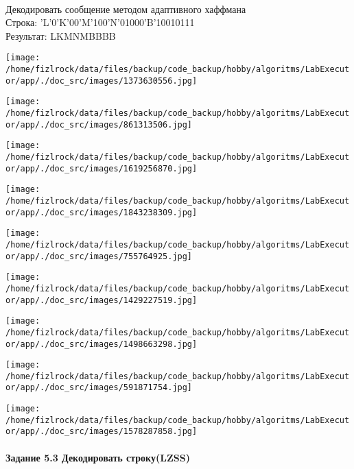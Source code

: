 \documentclass[a4paper, 12pt]{article}
\begin{document}
\\ 

Декодировать сообщение методом адаптивного хаффмана \\
Строка: 
'L'0'K'00'M'100'N'01000'B'10010111\\
Результат: LKMNMBBBB

\texttt{[image: /home/fizlrock/data/files/backup/code\_backup/hobby/algoritms/LabExecutor/app/./doc\_src/images/1373630556.jpg]}

\texttt{[image: /home/fizlrock/data/files/backup/code\_backup/hobby/algoritms/LabExecutor/app/./doc\_src/images/861313506.jpg]}

\texttt{[image: /home/fizlrock/data/files/backup/code\_backup/hobby/algoritms/LabExecutor/app/./doc\_src/images/1619256870.jpg]}

\texttt{[image: /home/fizlrock/data/files/backup/code\_backup/hobby/algoritms/LabExecutor/app/./doc\_src/images/1843238309.jpg]}

\texttt{[image: /home/fizlrock/data/files/backup/code\_backup/hobby/algoritms/LabExecutor/app/./doc\_src/images/755764925.jpg]}

\texttt{[image: /home/fizlrock/data/files/backup/code\_backup/hobby/algoritms/LabExecutor/app/./doc\_src/images/1429227519.jpg]}

\texttt{[image: /home/fizlrock/data/files/backup/code\_backup/hobby/algoritms/LabExecutor/app/./doc\_src/images/1498663298.jpg]}

\texttt{[image: /home/fizlrock/data/files/backup/code\_backup/hobby/algoritms/LabExecutor/app/./doc\_src/images/591871754.jpg]}

\texttt{[image: /home/fizlrock/data/files/backup/code\_backup/hobby/algoritms/LabExecutor/app/./doc\_src/images/1578287858.jpg]}
\pagebreak
\paragraph{Задание 5.3 Декодировать строку(LZSS)\\}
\end{document}
